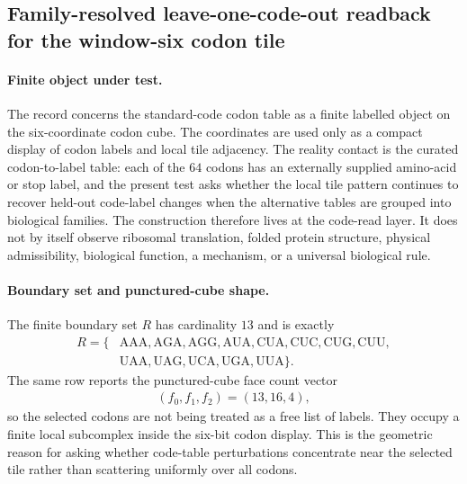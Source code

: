 \subsection{Family-resolved leave-one-code-out readback for the window-six codon tile}
\label{sec:h1-leave-one-code-out-by-family}

\paragraph{Finite object under test.}
The record concerns the standard-code codon table as a finite labelled object on the six-coordinate codon cube.  The coordinates are used only as a compact display of codon labels and local tile adjacency.  The reality contact is the curated codon-to-label table: each of the $64$ codons has an externally supplied amino-acid or stop label, and the present test asks whether the local tile pattern continues to recover held-out code-label changes when the alternative tables are grouped into biological families.  The construction therefore lives at the code-read layer.  It does not by itself observe ribosomal translation, folded protein structure, physical admissibility, biological function, a mechanism, or a universal biological rule.

\paragraph{Boundary set and punctured-cube shape.}
The finite boundary set $R$ has cardinality $13$ and is exactly
$$
\begin{aligned}
R=\{&\mathrm{AAA},\mathrm{AGA},\mathrm{AGG},\mathrm{AUA},\mathrm{CUA},\mathrm{CUC},\mathrm{CUG},\mathrm{CUU},\\
&\mathrm{UAA},\mathrm{UAG},\mathrm{UCA},\mathrm{UGA},\mathrm{UUA}\}.
\end{aligned}
$$
The same row reports the punctured-cube face count vector
$$
\begin{aligned}
(f_0,f_1,f_2)=(13,16,4),
\end{aligned}
$$
so the selected codons are not being treated as a free list of labels.  They occupy a finite local subcomplex inside the six-bit codon display.  This is the geometric reason for asking whether code-table perturbations concentrate near the selected tile rather than scattering uniformly over all codons.

